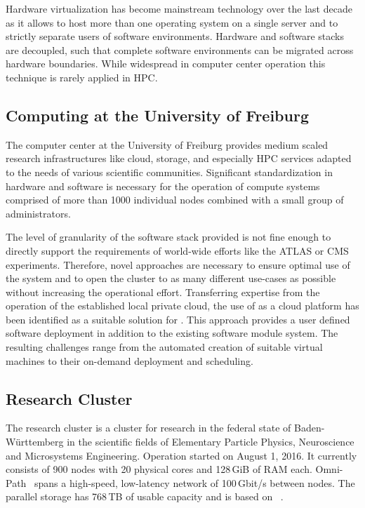 Hardware virtualization has become mainstream technology over the last decade as it allows
to host more than one operating system on a single server and to strictly
separate users of software environments.
Hardware and software stacks are decoupled, such that complete software
environments can be migrated across hardware boundaries.
While widespread in computer center
operation this technique is rarely applied in HPC.

\subsection{Computing at the University of Freiburg}

The computer center at the University of Freiburg provides
medium scaled research
infrastructures like cloud, storage, and especially HPC services adapted to the
needs of various scientific communities. Significant standardization
in hardware and software is necessary for the operation of compute systems comprised of
more than 1000 individual nodes combined with a small group of administrators.

The level of granularity of the software stack provided is not fine enough to
directly support the requirements of world-wide efforts like the
ATLAS or CMS experiments.
Therefore, novel approaches are necessary to ensure optimal use of the system and to open the cluster to as many different use-cases as
possible without increasing the operational effort.
Transferring expertise from the operation of the established local
private cloud, %
the use of \Openstack as a cloud platform has been identified
as a
suitable solution for \NEMO. This approach provides a user defined software
deployment in addition to the existing software module system.
The resulting challenges range from the automated creation of suitable
virtual machines to their on-demand deployment and scheduling.

\subsection{Research Cluster \NEMO}

The research cluster \NEMO is a cluster for 
research in the federal state of Baden-W\"urttemberg in the scientific fields of Elementary Particle Physics, Neuroscience and
Microsystems Engineering. Operation started on  August 1, 2016.
It currently consists of 900 nodes with 20 physical cores and 128\,GiB of RAM each.
Omni-Path~\cite{Omnipath} spans a high-speed, low-latency network of 100\,Gbit/s between nodes.
The parallel storage has
768\,TB of usable capacity and is based on \BeeGFS~\cite{BeeGFS}.

